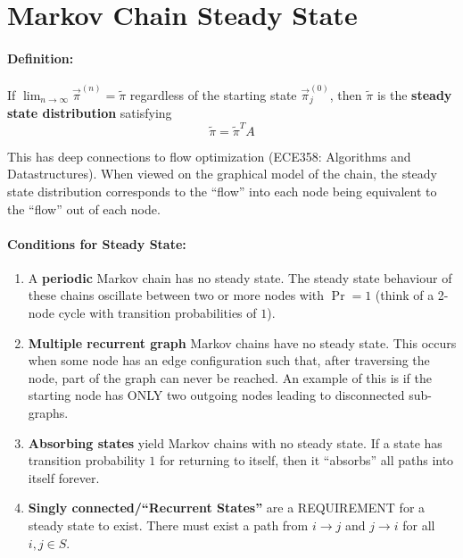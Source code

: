 \documentclass[a4paper,12pt]{report}
\begin{document}
\section{Markov Chain Steady State}

\paragraph{Definition: } If $\lim_{n\to \infty} \vec \pi^{(n)} = \tilde \pi$ regardless of the starting state $\vec \pi_j^{(0)}$, then $\tilde \pi$ is the \textbf{steady state distribution} satisfying
\begin{equation}
\tilde \pi = \tilde \pi^T A
\end{equation}

This has deep connections to flow optimization (ECE358: Algorithms and Datastructures). When viewed on the graphical model of the chain, the steady state distribution corresponds to the ``flow'' into each node being equivalent to the ``flow'' out of each node. 

\paragraph{Conditions for Steady State: } 
\begin{enumerate}
\item A \textbf{periodic} Markov chain has no steady state. The steady state behaviour of these chains oscillate between two or more nodes with $\Pr = 1$ (think of a 2-node cycle with transition probabilities of $1$).
\item \textbf{Multiple recurrent graph} Markov chains have no steady state. This occurs when some node has an edge configuration such that, after traversing the node, part of the graph can never be reached. An example of this is if the starting node has ONLY two outgoing nodes leading to disconnected sub-graphs. 
\item \textbf{Absorbing states} yield Markov chains with no steady state. If a state has transition probability $1$ for returning to itself, then it ``absorbs'' all paths into itself forever. 
\item \textbf{Singly connected/``Recurrent States''} are a REQUIREMENT for a steady state to exist. There must exist a path from $i\to j$ and $j\to i$ for all $i,j\in S$.
\end{enumerate}
\end{document}
